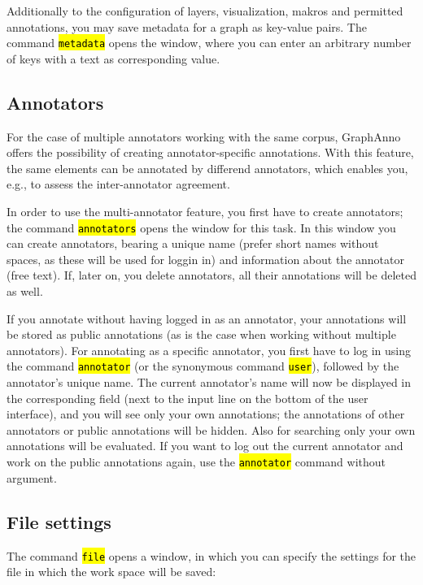 \documentclass[12pt]{scrartcl}
\newcommand{\code}[1]{\hl{\texttt{#1}}}
\begin{document}
Additionally to the configuration of layers, visualization, makros and permitted annotations, you may save metadata for a graph as key-value pairs.
The command \code{metadata} opens the window, where you can enter an arbitrary number of keys with a text as corresponding value.

\subsection{Annotators}\label{annotatoren}

For the case of multiple annotators working with the same corpus, GraphAnno offers the possibility of creating annotator-specific annotations.
With this feature, the same elements can be annotated by differend annotators, which enables you, e.g., to assess the inter-annotator agreement.

In order to use the multi-annotator feature, you first have to create annotators; the command \code{annotators} opens the window for this task.
In this window you can create annotators, bearing a unique name (prefer short names without spaces, as these will be used for loggin in) and information about the annotator (free text).
If, later on, you delete annotators, all their annotations will be deleted as well.

If you annotate without having logged in as an annotator, your annotations will be stored as public annotations (as is the case when working without multiple annotators).
For annotating as a specific annotator, you first have to log in using the command \code{annotator} (or the synonymous command \code{user}), followed by the annotator’s unique name.
The current annotator’s name will now be displayed in the corresponding field (next to the input line on the bottom of the user interface), and you will see only your own annotations; the annotations of other annotators or public annotations will be hidden.
Also for searching only your own annotations will be evaluated.
If you want to log out the current annotator and work on the public annotations again, use the \code{annotator} command without argument.

\subsection{File settings}

The command \code{file} opens a window, in which you can specify the settings for the file in which the work space will be saved:
\end{document}
